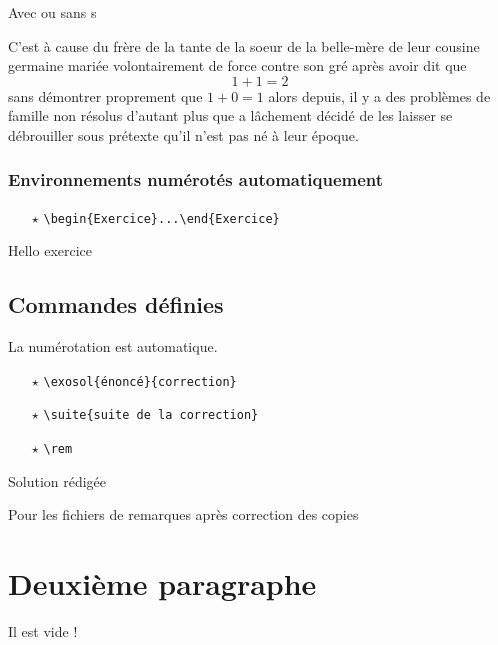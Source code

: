 \documentclass[12pt,french,oneside]{book}
\begin{document}
\begin{spacing}{1.2}
\begin{Rmq}[s]
Avec ou sans s
\end{Rmq}

\begin{Demo}
C'est à cause du frère de la tante de la s{oe}ur de la belle-mère de leur cousine germaine mariée volontairement de force contre son gré après avoir dit que \[1 + 1 = 2\] sans démontrer proprement que $1 + 0 = 1$ alors depuis, il y a des problèmes de famille non résolus d'autant plus que  a lâchement décidé de les laisser se débrouiller sous prétexte qu'il n'est pas né à leur époque.
\end{Demo}

\subsubsection{Environnements numérotés automatiquement}

\begin{itemize}

\item[$\star$] \verb=\begin{Exercice}...\end{Exercice}=\,

\end{itemize}


\begin{Exercice}
Hello exercice
\end{Exercice}

\subsection{Commandes définies}

La numérotation est automatique.

\begin{itemize}
\item[$\star$] \verb=\exosol{énoncé}{correction}=\,

\item[$\star$] \verb=\suite{suite de la correction}=\,

\item[$\star$] \verb=\rem=\,

\end{itemize}

{
Solution rédigée
}


Pour les fichiers de remarques après correction des copies

\rem

\rem

\section{Deuxième paragraphe}

Il est vide !

\end{spacing}
\end{document}
